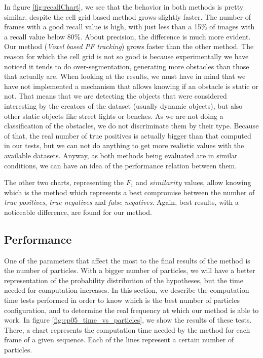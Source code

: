 In figure \ref{fig:recallChart}, we see that the behavior in both methods is pretty similar, despite the cell grid based method grows slightly faster. The number of frames with a good recall value is high, with just less than a 15\% of images with a recall value below 80\%. About precision, the difference is much more evident. Our method (\emph{Voxel based PF tracking}) grows faster than the other method. The reason for which the cell grid is not so good is because experimentally we have noticed it tends to do over-segmentation, generating more obstacles than those that actually are. When looking at the results, we must have in mind that we have not implemented a mechanism that allows knowing if an obstacle is static or not. That means that we are detecting the objects that were considered interesting by the creators of the dataset (usually dynamic objects), but also other static objects like street lights or benches. As we are not doing a classification of the obstacles, we do not discriminate them by their type. Because of that, the real number of true positives is actually bigger than that computed in our tests, but we can not do anything to get more realistic values with the available datasets. Anyway, as both methods being evaluated are in similar conditions, we can have an idea of the performance relation between them.

The other two charts, representing the $F_1$ and $similarity$ values, allow knowing which is the method which represents a best compromise between the number of \emph{true positives}, \emph{true negatives} and \emph{false negatives}. Again, best results, with a noticeable difference, are found for our method.

\subsection{Performance}\label{ch:chapter05_02_04}

One of the parameters that affect the most to the final results of the method is the number of particles. With a bigger number of particles, we will have a better representation of the probability distribution of the hypotheses, but the time needed for computation increases. In this section, we describe the computation time tests performed in order to know which is the best number of particles configuration, and to determine the real frequency at which our method is able to work.
In figure \ref{fig:cp05_time_vs_particles}, we show the results of these tests. There, a chart represents the computation time needed by the method for each frame of a given sequence. Each of the lines represent a certain number of particles.

